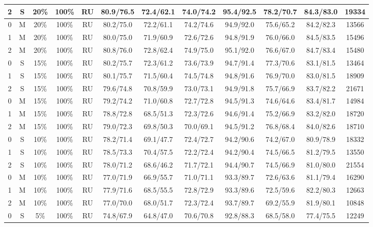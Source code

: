 \begin{table*}
{\begin{tabular}{|c|c|c|c|c||c|c|c|c|c|c||c|}
2 & S & 20\% & 100\% & RU & 80.9/76.5 & 72.4/62.1 & 74.0/74.2 & 95.4/92.5 & 78.2/70.7 & 84.3/83.0 & 19334 \\ \hline
0 & M & 20\% & 100\% & RU & 80.2/75.0 & 72.2/61.1 & 74.2/74.6 & 94.9/92.0 & 75.6/65.2 & 84.2/82.3 & 13566 \\ \hline
1 & M & 20\% & 100\% & RU & 80.0/75.0 & 71.9/60.9 & 72.6/72.6 & 94.8/91.9 & 76.0/66.0 & 84.5/83.5 & 15496 \\ \hline
2 & M & 20\% & 100\% & RU & 80.8/76.0 & 72.8/62.4 & 74.9/75.0 & 95.1/92.0 & 76.6/67.0 & 84.7/83.4 & 15480 \\ \hline
0 & S & 15\% & 100\% & RU & 80.2/75.7 & 72.3/61.2 & 73.6/73.9 & 94.7/91.4 & 77.3/70.6 & 83.1/81.5 & 13464 \\ \hline
1 & S & 15\% & 100\% & RU & 80.1/75.7 & 71.5/60.4 & 74.5/74.8 & 94.8/91.6 & 76.9/70.0 & 83.0/81.5 & 18909 \\ \hline
2 & S & 15\% & 100\% & RU & 79.6/74.8 & 70.8/59.9 & 73.0/73.1 & 94.9/91.8 & 75.7/66.9 & 83.7/82.2 & 21671 \\ \hline
0 & M & 15\% & 100\% & RU & 79.2/74.2 & 71.0/60.8 & 72.7/72.8 & 94.5/91.3 & 74.6/64.6 & 83.4/81.7 & 14984 \\ \hline
1 & M & 15\% & 100\% & RU & 78.8/72.8 & 68.5/51.3 & 72.3/72.6 & 94.6/91.4 & 75.2/66.9 & 83.2/82.0 & 18720 \\ \hline
2 & M & 15\% & 100\% & RU & 79.0/72.3 & 69.8/50.3 & 70.0/69.1 & 94.5/91.2 & 76.8/68.4 & 84.0/82.6 & 18710 \\ \hline
0 & S & 10\% & 100\% & RU & 78.2/71.4 & 69.1/47.7 & 72.4/72.7 & 94.2/90.6 & 74.2/67.0 & 80.9/78.9 & 18332 \\ \hline
1 & S & 10\% & 100\% & RU & 78.5/73.3 & 70.4/57.5 & 72.2/72.4 & 94.2/90.4 & 74.5/66.5 & 81.2/79.5 & 13550 \\ \hline
2 & S & 10\% & 100\% & RU & 78.0/71.2 & 68.6/46.2 & 71.7/72.1 & 94.4/90.7 & 74.5/66.9 & 81.0/80.0 & 21554 \\ \hline
0 & M & 10\% & 100\% & RU & 77.0/71.9 & 66.9/55.7 & 71.0/71.1 & 93.3/89.7 & 72.6/63.6 & 81.1/79.4 & 16290 \\ \hline
1 & M & 10\% & 100\% & RU & 77.9/71.6 & 68.5/55.5 & 72.8/72.9 & 93.3/89.6 & 72.5/59.6 & 82.2/80.3 & 12663 \\ \hline
2 & M & 10\% & 100\% & RU & 77.0/70.0 & 68.0/51.7 & 72.3/72.4 & 93.7/89.7 & 69.2/55.9 & 81.9/80.1 & 10848 \\ \hline
0 & S & 5\% & 100\% & RU & 74.8/67.9 & 64.8/47.0 & 70.6/70.8 & 92.8/88.3 & 68.5/58.0 & 77.4/75.5 & 12249 \\ \hline

\end{tabular}}
\end{table*}
